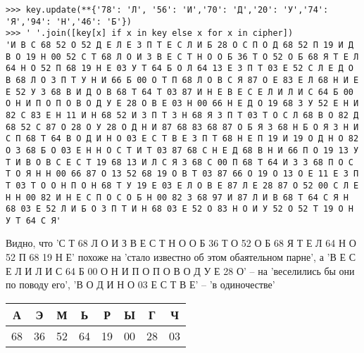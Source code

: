 \documentclass[letterpaper,11pt,openany]{book}
\begin{document}
\begin{lstlisting}
>>> key.update(**{'78': 'Л', '56': 'И','70': 'Д','20': 'У','74': 'Я','94': 'Н','46': 'Б'})
>>> ' '.join([key[x] if x in key else x for x in cipher])
'И В С 68 52 О 52 Д Е Л Е З П Т Е С Л И Б 28 О С П О Д 68 52 П 19 И Д В О 19 Н 00 52 С Т 68 Л О И З В Е С Т Н О О Б 36 Т О 52 О Б 68 Я Т Е Л 64 Н О 52 П 68 19 Н Е 03 У Т 64 Б О Л 64 13 Е З П Т 03 Е 52 С Л Е Д О В 68 Л О З П Т У Н И 66 Б 00 О Т П 68 Л О В С Я 87 О Е 83 Е Л 68 Н И Е Е 52 У З 68 В И Д О В 68 Т 64 Т 03 87 И Н Е В Е С Е Л И Л И С 64 Б 00 О Н И П О П О В О Д У Е 28 О В Е 03 Н 00 66 Н Е Д О 19 68 З У 52 Е Н И 82 С 83 Е Н 11 И Н 68 52 И З П Т З Н 68 Я З П Т 03 Т О С Л 68 В О 82 Д 68 52 С 87 О 28 О У 28 О Д Н И 87 68 83 68 87 О Б Я З 68 Н Б О Я З Н И С П 68 Т 64 В О Д И Н О 03 Е С Т В Е З П Т 68 Н Е П 19 И 19 О Д Н О 82 О З 68 Б О 03 Е Н Н О С Т И Т 03 87 68 С Н Е Д 68 В Н И 66 П О 19 13 У Т И В О В С Е С Т 19 68 13 И Л С Я З 68 С 00 П 68 Т 64 И З З 68 П О С Т О Я Н Н 00 66 87 О 13 52 68 19 О В Т 03 87 66 О 19 О 13 О Е 11 Е З П Т 03 Т О О Н П О Н 68 Т У 19 Е 03 Е Л О В Е 87 Л Е 28 87 О 52 00 С Л Е Н Н 00 82 И Н Е С П О С О Б Н 00 82 З 68 97 И 87 Л И В 68 Т 64 С Я Н 68 03 Е 52 Л И Б О З П Т И Н 68 03 Е 52 О 83 Н О И У 52 О 52 Т 19 О Н У Т 64 С Я'
\end{lstlisting}

Видно, что 'С Т 68 Л О И З В Е С Т Н О О Б 36 Т О 52 О Б 68 Я Т Е Л 64 Н О 52 П 68 19 Н Е' похоже на 'стало известно об этом обаятельном парне', а 'В Е С Е Л И Л И С 64 Б 00 О Н И П О П О В О Д У Е 28 О' -- на 'веселились бы они по поводу его', 'В О Д И Н О 03 Е С Т В Е' -- 'в одиночестве'

\medskip

{\centering
\begin{tabular}{||c|c|c|c|c|c|c|c||}
\hline
\textbf{А} & \textbf{Э} & \textbf{М} & \textbf{Ь} & \textbf{Р} & \textbf{Ы} & \textbf{Г} & \textbf{Ч} \\
\hline
68 & 36 & 52 & 64 & 19 & 00 & 28 & 03 \\
\hline
\end{tabular}

}
\medskip
\end{document}

